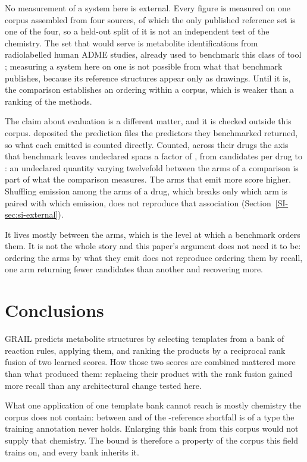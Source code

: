 No measurement of a system here is external. Every figure is measured on one corpus assembled from
four sources, of which the only published reference set is one of the four, so a held-out split of
it is not an independent test of the chemistry. The set that would serve is metabolite
identifications from radiolabelled human ADME studies, already used to benchmark this class of tool
\citep{Gao_2026}; measuring a system here on one is not possible from what that benchmark
publishes, because its reference structures appear only as drawings. Until it is, the comparison
establishes an ordering within a corpus, which is weaker than a ranking of the methods.

The claim about evaluation is a different matter, and it is checked outside this corpus.
\citet{Gao_2026} deposited the prediction files the \numExtbudgetArmsWord{} predictors they
benchmarked returned, so what each emitted is counted directly. Counted, across their
\numExtbudgetDrugs{} drugs the axis that benchmark leaves undeclared spans a factor of
\numExtbudgetRatio{}, from \numExtbudgetNarrowest{} candidates per drug to
\numExtbudgetWidest{}: an undeclared quantity varying twelvefold between the arms of a
comparison is part of what the comparison measures. The arms that emit more score higher. Shuffling emission among the arms of a drug, which breaks only which arm is paired with which emission, does not reproduce that association (Section~\ref{SI-sec:si-external}).

It lives mostly between the arms, which is the level at which a benchmark orders them. It is not the whole story and
this paper's argument does not need it to be: ordering the arms by what they emit does not
reproduce ordering them by recall, one arm returning fewer candidates than another and recovering
more.
\section{Conclusions}
\label{sec:conclusions}

GRAIL predicts metabolite structures by selecting templates from a bank of \numBankRules{} reaction
rules, applying them, and ranking the products by a reciprocal rank fusion of two learned scores.
How those two scores are combined mattered more than what produced them: replacing their product
with the rank fusion gained more recall than any architectural change tested here.

What one application of one template bank cannot reach is mostly chemistry the corpus does not
contain: between \numBoundShortfallsharemin{} and \numBoundShortfallsharemax{} of the
\numCeilingUncovered{}-reference shortfall is of a type the training annotation never holds.
Enlarging this bank from this corpus would not supply that chemistry. The bound is therefore a property of the corpus this field trains on, and every bank inherits it.

